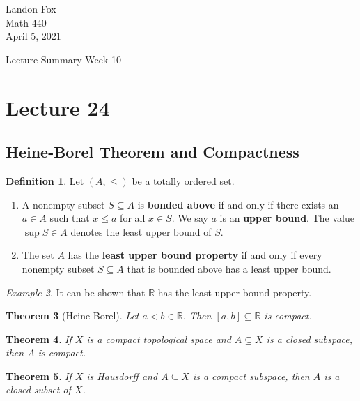 \documentclass[ 12pt ]{article}
\newcounter{lecture_num}
\theoremstyle{plain}
\theoremstyle{plain}
\newtheorem{theorem}{Theorem}[lecture_num]
\theoremstyle{definition}
\newtheorem{definition}[theorem]{Definition}
\theoremstyle{remark}
\newtheorem{example}[theorem]{Example}
\begin{document}
\noindent Landon Fox \\
\noindent Math 440 \\
\noindent April 5, 2021

\begin{center}
	\Large Lecture Summary Week 10
\end{center}

\setcounter{lecture_num}{24}
\setcounter{theorem}{0}
\section*{Lecture 24}

\subsection*{Heine-Borel Theorem and Compactness}

\begin{definition}
	Let $(A, \leq)$ be a totally ordered set.
	\begin{enumerate}
		\item A nonempty subset $S \subseteq A$ is \textbf{bonded above} if and only if there exists an $a \in A$ such that $x \leq a$ for all $x \in S$. We say $a$ is an \textbf{upper
			bound}. The value $\sup S \in A$ denotes the least upper bound of $S$.
		\item The set $A$ has the \textbf{least upper bound property} if and only if every nonempty subset $S \subseteq A$ that is bounded above has a least upper bound.
	\end{enumerate}
\end{definition}

\begin{example}
	It can be shown that $\mathbb{R}$ has the least upper bound property.
\end{example}

\begin{theorem}[Heine-Borel]
	Let $a < b \in \mathbb{R}$. Then $[a, b] \subseteq \mathbb{R}$ is compact.
\end{theorem}

\begin{theorem}
	If $X$ is a compact topological space and $A \subseteq X$ is a closed subspace, then $A$ is compact.
\end{theorem}

\begin{theorem}
	If $X$ is Hausdorff and $A \subseteq X$ is a compact subspace, then $A$ is a closed subset of $X$.
\end{theorem}
\end{document}
